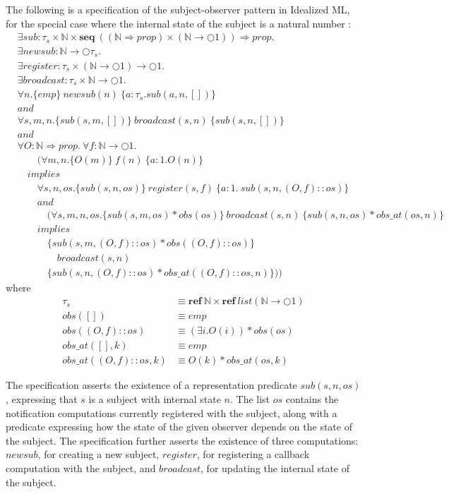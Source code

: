 \documentclass[a4paper,english]{article}
\newcommand{\N}[0]{\mathbb{N}}
\newcommand{\LIST}[0]{list}
\newcommand{\SEQ}[0]{\mathbf{seq}}
\newcommand{\MONAD}[0]{\bigcirc}
\newcommand{\AND}[0]{and}
\newcommand{\IMPLIES}[0]{implies}
\newcommand{\REF}[0]{\mathbf{ref}}
\begin{document}
The following is a specification of the subject-observer pattern in Idealized
ML, for the special case where the internal state of the subject is a natural
number \cite{subobj}:
\begin{align*}
&\exists sub : \tau_s \times \N \times \SEQ\ ((\N \Rightarrow prop) \times (\N \rightarrow \MONAD 1)) \Rightarrow prop.\\
&\exists newsub : \N \rightarrow \MONAD \tau_s.\\
&\exists register : \tau_s \times (\N \rightarrow \MONAD 1) \rightarrow \MONAD
1.\\
&\exists broadcast : \tau_s \times \N \rightarrow \MONAD 1.\\
&\forall n. \{ emp \}\ newsub(n)\ \{ a : \tau_s. sub(a, n, []) \}\\
&\AND\\
&\forall s, m, n. \{ sub(s, m, []) \}\ broadcast(s, n)\ \{ sub(s, n, []) \}\\
&\AND\\
&\forall O : \N \Rightarrow prop.\ \forall f : \N \rightarrow \MONAD 1.\\
&\quad\quad(\forall m, n. \{ O(m) \}\ f(n)\ \{ a : 1. O(n) \}\\
&\quad\IMPLIES\\
&\quad\quad\forall s, n, os. \{ sub(s, n, os) \}\ register(s, f)\ \{ a : 1.\
sub(s, n, (O, f)::os) \}\\
&\quad\quad\AND\\
&\quad\quad\quad(\forall s, m, n, os. \{ sub(s, m, os) * obs(os) \}\ broadcast(s, n)\
\{ sub(s, n, os) * obs\_at(os, n) \}\\
&\quad\quad\IMPLIES\\
&\quad\quad\quad \{ sub(s, m, (O, f) :: os) * obs((O, f)::os) \}\\
&\quad\quad\quad\quad broadcast(s, n)\\
&\quad\quad\quad \{ sub(s, n, (O, f) :: os) * obs\_at((O, f)::os, n) \}))
\end{align*}
where
\begin{align*}
\tau_s &\equiv \REF\ \N \times \REF\ \LIST (\N \rightarrow \MONAD 1)\\
obs([]) &\equiv emp\\
obs((O, f)::os) &\equiv (\exists i. O(i)) * obs(os)\\
obs\_at([], k) &\equiv emp\\
obs\_at((O, f)::os, k) &\equiv O(k) * obs\_at(os, k)
\end{align*}

The specification asserts the existence of a representation predicate $sub(s,
n, os)$, expressing that $s$ is a subject with internal state $n$. The list
$os$ contains the notification computations currently registered with the
subject, along with a predicate expressing how the state of the given observer
depends on the state of the subject. The specification further asserts the
existence of three computations: $newsub$, for creating a new subject,
$register$, for registering a callback computation with the subject, and
$broadcast$, for updating the internal state of the subject.
\end{document}
